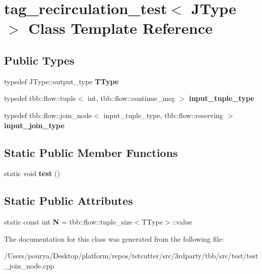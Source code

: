 \hypertarget{classtag__recirculation__test}{}\section{tag\+\_\+recirculation\+\_\+test$<$ J\+Type $>$ Class Template Reference}
\label{classtag__recirculation__test}
\subsection*{Public Types}
\begin{DoxyCompactItemize}
\item 
\hypertarget{classtag__recirculation__test_a029886e5d5f57f1f4aefe26852946fe1}{}typedef J\+Type\+::output\+\_\+type {\bfseries T\+Type}\label{classtag__recirculation__test_a029886e5d5f57f1f4aefe26852946fe1}

\item 
\hypertarget{classtag__recirculation__test_abab26e3df40c983e9852be7211ebeb04}{}typedef tbb\+::flow\+::tuple$<$ int, tbb\+::flow\+::continue\+\_\+msg $>$ {\bfseries input\+\_\+tuple\+\_\+type}\label{classtag__recirculation__test_abab26e3df40c983e9852be7211ebeb04}

\item 
\hypertarget{classtag__recirculation__test_a656bab12873fa350e343e15ed0610a2e}{}typedef tbb\+::flow\+::join\+\_\+node$<$ input\+\_\+tuple\+\_\+type, tbb\+::flow\+::reserving $>$ {\bfseries input\+\_\+join\+\_\+type}\label{classtag__recirculation__test_a656bab12873fa350e343e15ed0610a2e}

\end{DoxyCompactItemize}
\subsection*{Static Public Member Functions}
\begin{DoxyCompactItemize}
\item 
\hypertarget{classtag__recirculation__test_a8aeca8516df5d1cc65ebb7d5f1a8c3ab}{}static void {\bfseries test} ()\label{classtag__recirculation__test_a8aeca8516df5d1cc65ebb7d5f1a8c3ab}

\end{DoxyCompactItemize}
\subsection*{Static Public Attributes}
\begin{DoxyCompactItemize}
\item 
\hypertarget{classtag__recirculation__test_aebb670e503a2af64c36d6b4c6b7e8875}{}static const int {\bfseries N} = tbb\+::flow\+::tuple\+\_\+size$<$T\+Type$>$\+::value\label{classtag__recirculation__test_aebb670e503a2af64c36d6b4c6b7e8875}

\end{DoxyCompactItemize}


The documentation for this class was generated from the following file\+:\begin{DoxyCompactItemize}
\item 
/\+Users/pourya/\+Desktop/platform/repos/tetcutter/src/3rdparty/tbb/src/test/test\+\_\+join\+\_\+node.\+cpp\end{DoxyCompactItemize}
